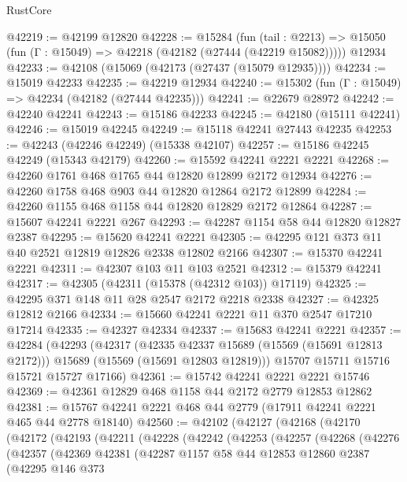 \begin{lexlean}{RustCore}
\begin{coremodule}
@42219 := @42199 @12820
@42228 := @15284
    (fun (tail : @2213) => @15050 (fun (Γ : @15049) => @42218 (@42182 (@27444 (@42219 @15082)))))
    @12934
@42233 := @42108 (@15069 (@42173 (@27437 (@15079 @12935))))
@42234 := @15019 @42233
@42235 := @42219 @12934
@42240 := @15302 (fun (Γ : @15049) => @42234 (@42182 (@27444 @42235)))
@42241 := @22679 @28972
@42242 := @42240 @42241
@42243 := @15186 @42233
@42245 := @42180 (@15111 @42241)
@42246 := @15019 @42245
@42249 := @15118 @42241 @27443 @42235
@42253 := @42243 (@42246 @42249) (@15338 @42107)
@42257 := @15186 @42245 @42249 (@15343 @42179)
@42260 := @15592 @42241 @2221 @2221
@42268 := @42260 @1761 @468 @1765 @44 @12820 @12899 @2172 @12934
@42276 := @42260 @1758 @468 @903 @44 @12820 @12864 @2172 @12899
@42284 := @42260 @1155 @468 @1158 @44 @12820 @12829 @2172 @12864
@42287 := @15607 @42241 @2221 @267
@42293 := @42287 @1154 @58 @44 @12820 @12827 @2387
@42295 := @15620 @42241 @2221
@42305 := @42295 @121 @373 @11 @40 @2521 @12819 @12826 @2338 @12802 @2166
@42307 := @15370 @42241 @2221
@42311 := @42307 @103 @11 @103 @2521
@42312 := @15379 @42241
@42317 := @42305 (@42311 (@15378 (@42312 @103)) @17119)
@42325 := @42295 @371 @148 @11 @28 @2547 @2172 @2218 @2338
@42327 := @42325 @12812 @2166
@42334 := @15660 @42241 @2221 @11 @370 @2547 @17210 @17214
@42335 := @42327 @42334
@42337 := @15683 @42241 @2221
@42357 := @42284
    (@42293
      (@42317
        (@42335 @42337 @15689 (@15569 (@15691 @12813 @2172)))
        @15689
        (@15569 (@15691 @12803 @12819)))
      @15707
      @15711
      @15716
      @15721
      @15727
      @17166)
@42361 := @15742 @42241 @2221 @2221 @15746
@42369 := @42361 @12829 @468 @1158 @44 @2172 @2779 @12853 @12862
@42381 := @15767 @42241 @2221 @468 @44 @2779 (@17911 @42241 @2221 @465 @44 @2778 @18140)
@42560 := @42102
    (@42127
      (@42168
        (@42170
          (@42172
            (@42193
              (@42211
                (@42228
                  (@42242
                    (@42253
                      (@42257
                        (@42268
                          (@42276
                            (@42357
                              (@42369
                                @42381
                                (@42287
                                  @1157
                                  @58
                                  @44
                                  @12853
                                  @12860
                                  @2387
                                  (@42295
                                    @146
                                    @373

\end{coremodule}
\end{lexlean}
